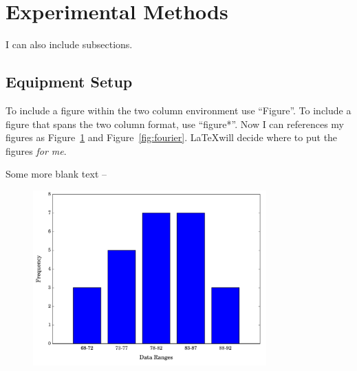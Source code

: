 
\section{Experimental Methods}
I can also include subsections. \blindtext

\subsection{Equipment Setup}
To include a figure within the two column environment use ``Figure''.
To include a figure that spans the two column format, use ``figure*''.
Now I can references my figures as Figure~\ref{fig:Hist1} and
Figure~\ref{fig:fourier}. \LaTeX will decide where to put the 
figures \textit{for me}. 

Some more blank text -- \blindtext


\begin{figure}[!t]
	\captionsetup{width=0.8\textwidth}
	\centering
	\includegraphics[width=0.8\textwidth]{Figures/Hist1}
	\caption{\blindtext}
	\label{fig:Hist1}
\end{figure}


